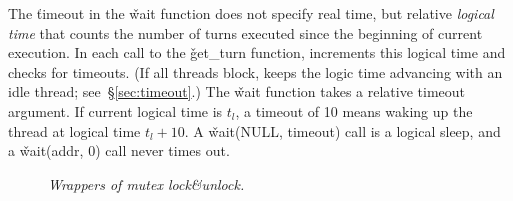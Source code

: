 
The \v{timeout} in the \v{wait} function does not specify real time, but relative \emph{logical time} that
counts the number of turns executed since the beginning of current
execution.  In each call to the \v{get\_turn} function, \xxx increments this logical
time and checks for timeouts. 
(If all threads block, \xxx keeps the logic time advancing with an idle
thread; see~\S\ref{sec:timeout}.)
The \v{wait} function takes a relative timeout argument.  If
current logical time is $t_l$, a timeout of 10 means waking up the thread
at logical time $t_l + 10$. A \v{wait(NULL, timeout)} 
call is a logical sleep, and a \v{wait(addr, 0)} call never times out.

\begin{figure}[t]
\centering
\begin{minipage}[t]{.38\textwidth}
\end{minipage}
\vspace{-1 mm}
\caption{{\em Wrappers of \pthread mutex lock\&unlock.}} \label{fig:lock}
\vspace{-0.0in}
\end{figure}

